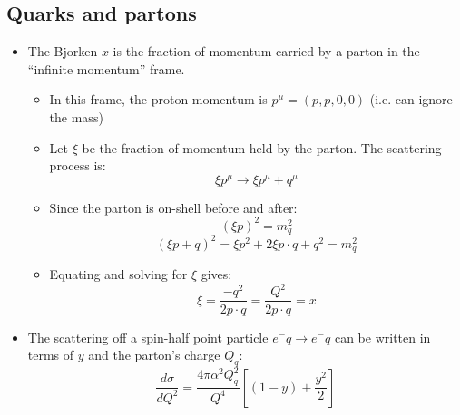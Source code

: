 \documentclass[11pt]{article}
\newcommand{\dd}[2]{\dfrac{d #1}{d #2}}
\newcommand{\el}{\ensuremath{e^{-}}}
\begin{document}
\subsection{Quarks and partons}
\begin{itemize}
  \item The Bjorken $x$ is the fraction of momentum carried by a parton in the ``infinite momentum'' frame.
  \begin{itemize}
    \item In this frame, the proton momentum is $p^\mu = (p,p,0,0)$ (i.e. can ignore the mass)
    \item Let $\xi$ be the fraction of momentum held by the parton. The scattering process is:
    \begin{equation}
      \xi p^\mu \rightarrow \xi p^\mu + q^\mu
    \end{equation}
    \item Since the parton is on-shell before and after:
    \begin{equation}
      (\xi p)^2 =  m_q^2
    \end{equation}
    \begin{equation}
      (\xi p + q)^2 = \xi p^2 + 2\xi p\cdot q + q^2 = m_q^2
    \end{equation}
    \item Equating and solving for $\xi$ gives:
    \begin{equation}
      \xi = \frac{-q^2}{2p\cdot q} = \frac{Q^2}{2p\cdot q} = x
    \end{equation}
  \end{itemize}
  \item The scattering off a spin-half point particle $\el q \rightarrow \el q$ can be written in terms of $y$ and the parton's charge $Q_q$:
  \begin{equation}
    \dd\sigma{Q^2} = \frac{4\pi\alpha^2Q_q^2}{Q^4} \left[(1-y) + \frac{y^2}{2}\right]
  \end{equation}
\end{itemize}
\end{document}
